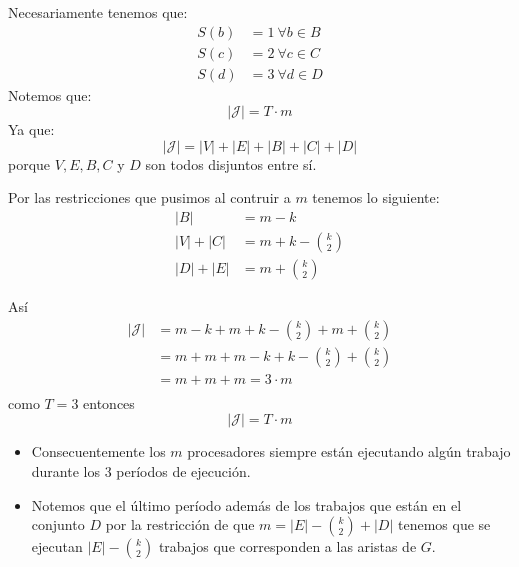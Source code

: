 \documentclass[spanish, xcolor=dvipsnames, aspectratio=169]{beamer}
\newcommand{\subsectiontitle}{}
\begin{document}
\begin{frame}{\subsectiontitle}
Necesariamente tenemos que:
\begin{align*}
    S\left(b\right) &= 1 \ \forall b \in B \\
    S\left(c\right) &= 2 \ \forall c \in C \\
    S\left(d\right) &= 3 \ \forall d \in D
\end{align*}
Notemos que:
\[
    |\mathcal{J}| = T \cdot m
\]
Ya que:
\[
    |\mathcal{J}|  = |V| + |E| + |B| + |C| + |D|
\]
porque $V, E, B, C$ y $D$ son todos disjuntos entre sí.
\end{frame}
\begin{frame}{\subsectiontitle}
Por las restricciones que pusimos al contruir a \(m\) tenemos lo siguiente:
\begin{align*}
    |B| &= m - k \\
    |V| + |C| &= m + k - \binom{k}{2} \\
    |D| + |E| &= m +\binom{k}{2}
\end{align*}
\end{frame}
\begin{frame}{\subsectiontitle}
    Así 
    \begin{align*}
        |\mathcal{J}| &= m - k + m + k - \binom{k}{2} + m +\binom{k}{2} \\ 
                      &= m + m + m - k + k  - \binom{k}{2} + \binom{k}{2} \\
                      &= m + m + m = 3 \cdot m \\
    \end{align*}
    como \(T = 3\) entonces 
    \[
        |\mathcal{J}| = T \cdot m
    \]
\end{frame}
\begin{frame}{\subsectiontitle}
    \begin{itemize}
        \item Consecuentemente los \(m\) procesadores siempre están ejecutando algún trabajo durante los \(3\) períodos de ejecución.
        \item Notemos que el último período además de los trabajos que están en el conjunto \(D\) por la restricción de que \(m = |E| - \binom{k}{2} + |D|\)
        tenemos que se ejecutan \(|E| - \binom{k}{2}\) trabajos que corresponden a las aristas de \(G\).
    \end{itemize}
\end{frame}
\end{document}

